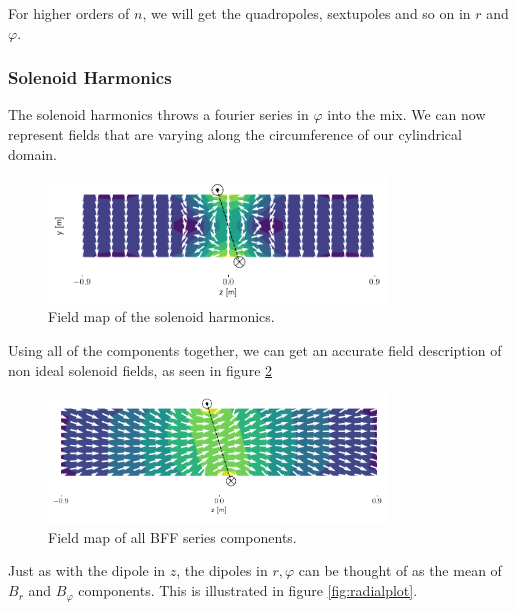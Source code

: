 For higher orders of $n$, we will get the quadropoles, sextupoles
and so on in $r$ and $\varphi$.

\subsubsection{Solenoid Harmonics}
The solenoid harmonics throws a fourier series in
$\varphi$ into the mix. We can now represent fields that 
are varying along the circumference of our cylindrical domain.

\begin{figure}[!h]
    \centering
    \includegraphics[width=0.8\textwidth]{figs/solharm.png}
    \caption{Field map of the solenoid harmonics.}
    \label{fig:solharm}
\end{figure}

Using all of the components together, we can get an accurate
field description of non ideal solenoid fields, as seen in figure
\ref{fig:allharmonics}

\begin{figure}[!h]
    \centering
    \includegraphics[width=0.8\textwidth]{figs/allcomponents.png}
    \caption{Field map of all BFF series components.}
    \label{fig:allharmonics}
\end{figure}

Just as with the dipole in $z$, the dipoles in $r,\varphi$
can be thought of as the mean of $B_r$ and $B_\varphi$
components.
This is illustrated in figure \ref{fig:radialplot}.

